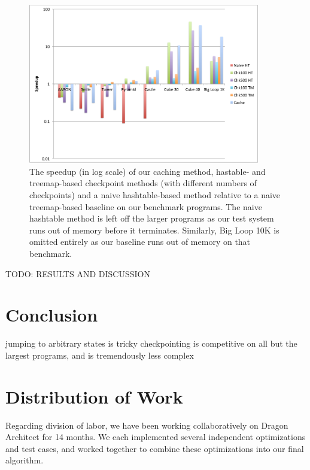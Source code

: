\documentclass{sig-alternate}
\newcommand{\todo}[1]{{\color{red} TODO: #1}}
\begin{document}
\begin{figure}[ht!]
  \centering
  \includegraphics[width=0.9\textwidth]{images/all-speedup}
  \caption{The speedup (in log scale) of our caching method, hastable- and treemap-based checkpoint methods (with different numbers of checkpoints) and a naive hashtable-based method relative to a naive treemap-based baseline on our benchmark programs. The naive hashtable method is left off the larger programs as our test system runs out of memory before it terminates. Similarly, Big Loop 10K is omitted entirely as our baseline runs out of memory on that benchmark.}
  \label{fig:all-speedup}
\end{figure}


\todo{RESULTS AND DISCUSSION}

\section{Conclusion}
jumping to arbitrary states is tricky
checkpointing is competitive on all but the largest programs, and is tremendously less complex

\section{Distribution of Work}
Regarding division of labor, we have been working collaboratively on Dragon Architect for 14 months. We each implemented several independent optimizations and test cases, and worked together to combine these optimizations into our final algorithm.




\appendix
\end{document}
